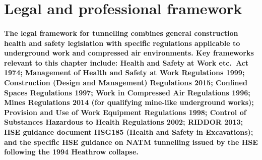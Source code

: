 \section{Legal and professional framework}

\paragraph{The legal framework for tunnelling combines general construction health and safety legislation with specific regulations applicable to underground work and compressed air environments. Key frameworks relevant to this chapter include: Health and Safety at Work etc.\ Act 1974; Management of Health and Safety at Work Regulations 1999; Construction (Design and Management) Regulations 2015; Confined Spaces Regulations 1997; Work in Compressed Air Regulations 1996; Mines Regulations 2014 (for qualifying mine-like underground works); Provision and Use of Work Equipment Regulations 1998; Control of Substances Hazardous to Health Regulations 2002; RIDDOR 2013; HSE guidance document HSG185 (Health and Safety in Excavations); and the specific HSE guidance on NATM tunnelling issued by the HSE following the 1994 Heathrow collapse.}

